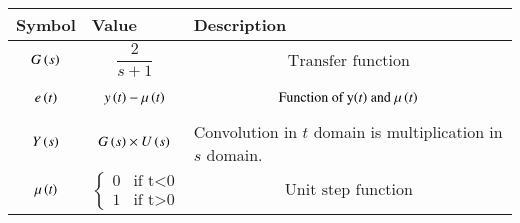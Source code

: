 \begin{tabular}{|p{1cm}|p{3.00cm}|p{3.50cm}|}
    \hline
    Symbol&Value&Description\\ \hline
    $$G\left(s\right)$$&$$\frac{2}{s+1}$$&$$\text{Transfer function}$$\\\hline
    $$e\left(t\right)$$&$$y\left(t\right)-\mu\left(t\right)$$&$$\text{Function of y\ensuremath{\left(t\right)} and $\mu\left(t\right)$}$$\\\hline
    $$Y\left(s\right)$$&$$G\left(s\right)\times U\left(s\right)$$&Convolution in $t$ domain is multiplication in $s$ domain.\\\hline
    $$\mu\left(t\right)$$&$$\begin{cases}
    0&\text{if t$<$0}\\
    1&\text{if t$>$0}
    \end{cases}$$&$$\text{Unit step function}$$\\\hline
    \end{tabular}